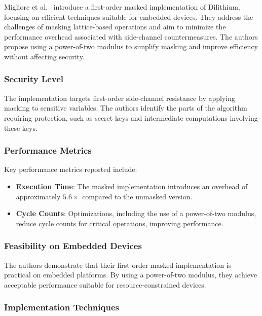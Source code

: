 Migliore et al.\ \cite{Migliore19} introduce a first-order masked implementation of Dilithium, focusing on efficient techniques suitable for embedded devices. They address the challenges of masking lattice-based operations and aim to minimize the performance overhead associated with side-channel countermeasures. The authors propose using a power-of-two modulus to simplify masking and improve efficiency without affecting security.

\subsubsection{Security Level}

The implementation targets first-order side-channel resistance by applying masking to sensitive variables. The authors identify the parts of the algorithm requiring protection, such as secret keys and intermediate computations involving these keys.

\subsubsection{Performance Metrics}

Key performance metrics reported include:

\begin{itemize}
    \item \textbf{Execution Time}: The masked implementation introduces an overhead of approximately $5.6\times$ compared to the unmasked version.
    \item \textbf{Cycle Counts}: Optimizations, including the use of a power-of-two modulus, reduce cycle counts for critical operations, improving performance.
\end{itemize}

\subsubsection{Feasibility on Embedded Devices}

The authors demonstrate that their first-order masked implementation is practical on embedded platforms. By using a power-of-two modulus, they achieve acceptable performance suitable for resource-constrained devices.

\subsubsection{Implementation Techniques}

